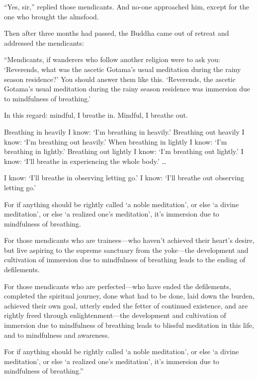 \documentclass[12pt,openany]{book}%
\begin{document}
“Yes, sir,” replied those mendicants. And no-one approached him, except for the one who brought the almsfood. 

Then after three months had passed, the Buddha came out of retreat and addressed the mendicants: 

“Mendicants, if wanderers who follow another religion were to ask you: ‘Reverends, what was the ascetic Gotama’s usual meditation during the rainy season residence?’ You should answer them like this. ‘Reverends, the ascetic Gotama’s usual meditation during the rainy season residence was immersion due to mindfulness of breathing.’ 

In this regard: mindful, I breathe in. Mindful, I breathe out. 

Breathing in heavily I know: ‘I’m breathing in heavily.’ Breathing out heavily I know: ‘I’m breathing out heavily.’ When breathing in lightly I know: ‘I’m breathing in lightly.’ Breathing out lightly I know: ‘I’m breathing out lightly.’ I know: ‘I’ll breathe in experiencing the whole body.’ … 

I know: ‘I’ll breathe in observing letting go.’ I know: ‘I’ll breathe out observing letting go.’ 

For if anything should be rightly called ‘a noble meditation’, or else ‘a divine meditation’, or else ‘a realized one’s meditation’, it’s immersion due to mindfulness of breathing. 

For those mendicants who are trainees—who haven’t achieved their heart’s desire, but live aspiring to the supreme sanctuary from the yoke—the development and cultivation of immersion due to mindfulness of breathing leads to the ending of defilements. 

For those mendicants who are perfected—who have ended the defilements, completed the spiritual journey, done what had to be done, laid down the burden, achieved their own goal, utterly ended the fetter of continued existence, and are rightly freed through enlightenment—the development and cultivation of immersion due to mindfulness of breathing leads to blissful meditation in this life, and to mindfulness and awareness. 

For if anything should be rightly called ‘a noble meditation’, or else ‘a divine meditation’, or else ‘a realized one’s meditation’, it’s immersion due to mindfulness of breathing.” 
\end{document}
